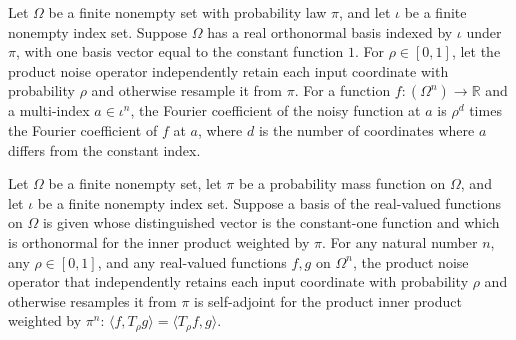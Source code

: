 \begin{theorem}
\label{FABL.FiniteFourierBasis.fourierCoeff_productNoiseOperator}
\leanok
{}
Let $\Omega$ be a finite nonempty set with probability law $\pi$, and let $\iota$ be a
finite nonempty index set. Suppose $\Omega$ has a real orthonormal basis indexed by
$\iota$ under $\pi$, with one basis vector equal to the constant function $1$. For
$\rho\in[0,1]$, let the product noise operator independently retain each input
coordinate with probability $\rho$ and otherwise resample it from $\pi$. For a function
$f:(\Omega^n)\to\mathbb R$ and a multi-index $a\in\iota^n$, the Fourier coefficient of
the noisy function at $a$ is $\rho^d$ times the Fourier coefficient of $f$ at $a$, where
$d$ is the number of coordinates where $a$ differs from the constant index.
\end{theorem}

\begin{theorem}
\label{FABL.productNoiseOperator_selfAdjoint}
\leanok
{}
Let $\Omega$ be a finite nonempty set, let $\pi$ be a probability mass function
on $\Omega$, and let $\iota$ be a finite nonempty index set. Suppose a basis of
the real-valued functions on $\Omega$ is given whose distinguished vector is the
constant-one function and which is orthonormal for the inner product weighted by
$\pi$. For any natural number $ n$, any $\rho\in[0,1]$, and any real-valued
functions $f,g$ on $\Omega^n$, the product noise operator that independently retains
each input coordinate with probability $\rho$ and otherwise resamples it from
$\pi$ is self-adjoint for the product inner product weighted by $\pi^n$:
$\langle f,T_\rho g\rangle=\langle T_\rho f,g\rangle$.
\end{theorem}


